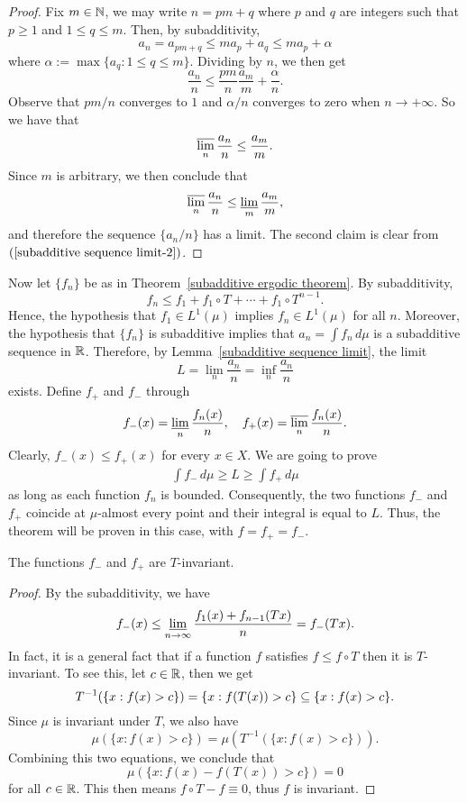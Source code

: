 \begin{proof}
Fix $m\in\mathbb{N}$, we may write $n=pm+q$ where $p$ and $q$ are integers such that $p\geq 1$ and $1\leq q\leq m$. Then, by subadditivity,
\[a_n=a_{pm+q}\leq ma_p+a_q\leq ma_p+\alpha\]
where $\alpha:=\max\{a_q:1\leq q\leq m\}$. Dividing by $n$, we then get
\[\frac{a_n}{n}\leq\frac{pm}{n}\frac{a_m}{m}+\frac{\alpha}{n}.\]
Observe that $pm/n$ converges to $1$ and $\alpha/n$ converges to zero when $n\to+\infty$. So we have that
\begin{align}\label{subadditive sequence limit-2}
\varlimsup_n\frac{a_n}{n}\leq\frac{a_m}{m}.
\end{align}
Since $m$ is arbitrary, we then conclude that
\[\varlimsup_n\frac{a_n}{n}\leq\varliminf_m\frac{a_m}{m},\]
and therefore the sequence $\{a_n/n\}$ has a limit. The second claim is clear from $(\ref{subadditive sequence limit-2})$.
\end{proof}
Now let $\{f_n\}$ be as in Theorem~\ref{subadditive ergodic theorem}. By subadditivity,
\[f_n\leq f_1+f_1\circ T+\cdots+f_1\circ T^{n-1}.\]
Hence, the hypothesis that $f_1\in L^1(\mu)$ implies $f_n\in L^1(\mu)$ for all $n$. Moreover, the hypothesis that $\{f_n\}$ is subadditive implies that $a_n=\int f_n\,d\mu$ is a subadditive sequence in $\mathbb{R}$. Therefore, by Lemma~\ref{subadditive sequence limit}, the limit
\[L=\lim_n\frac{a_n}{n}=\inf_n\frac{a_n}{n}\]
exists. Define $f_+$ and $f_-$ through
\[f_-(x)=\varliminf_n\frac{f_n(x)}{n},\quad f_+(x)=\varlimsup_n\frac{f_n(x)}{n}.\]
Clearly, $f_-(x)\leq f_+(x)$ for every $x\in X$. We are going to prove 
\begin{align}\label{subadditive ergodic theorem-1}
\int f_-\,d\mu\geq L\geq\int f_+\,d\mu
\end{align}
as long as each function $f_n$ is bounded. Consequently, the two functions $f_-$ and $f_+$ coincide at $\mu$-almost every point and their integral is equal to $L$. Thus, the theorem will be proven in this case, with $f=f_+=f_-$.
\begin{lemma}
The functions $f_-$ and $f_+$ are $T$-invariant.
\end{lemma}
\begin{proof}
By the subadditivity, we have
\[f_-(x)\leq\varliminf_{n\to\infty}\frac{f_1(x)+f_{n-1}(Tx)}{n}=f_-(Tx).\]
In fact, it is a general fact that if a function $f$ satisfies $f\leq f\circ T$ then it is $T$-invariant. To see this, let $c\in\mathbb{R}$, then we get
\[T^{-1}(\{x:f(x)>c\})=\{x:f(T(x))>c\}\subseteq\{x:f(x)>c\}.\]
Since $\mu$ is invariant under $T$, we also have
\[\mu(\{x:f(x)>c\})=\mu(T^{-1}(\{x:f(x)>c\})).\]
Combining this two equations, we conclude that
\[\mu(\{x:f(x)-f(T(x))>c\})=0\]
for all $c\in\mathbb{R}$. This then means $f\circ T-f\equiv 0$, thus $f$ is invariant.
\end{proof}
